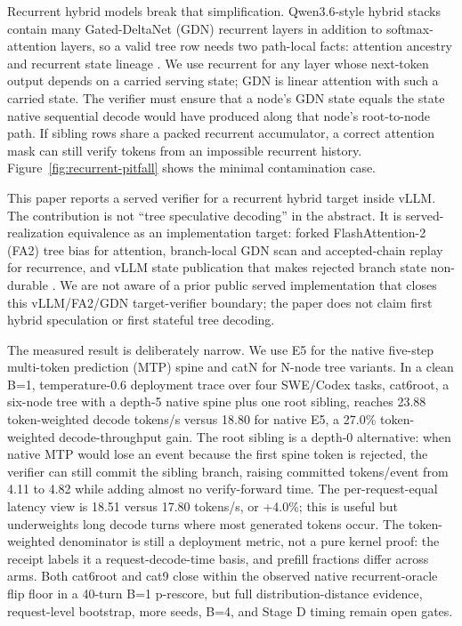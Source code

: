 \documentclass[conference]{IEEEtran}
\begin{document}
Recurrent hybrid models break that simplification. Qwen3.6-style hybrid stacks contain many Gated-DeltaNet (GDN) recurrent layers in addition to softmax-attention layers, so a valid tree row needs two path-local facts: attention ancestry and recurrent state lineage \cite{yang2024gated,qwen2026qwen36fp8}. We use recurrent for any layer whose next-token output depends on a carried serving state; GDN is linear attention with such a carried state. The verifier must ensure that a node's GDN state equals the state native sequential decode would have produced along that node's root-to-node path. If sibling rows share a packed recurrent accumulator, a correct attention mask can still verify tokens from an impossible recurrent history. Figure~\ref{fig:recurrent-pitfall} shows the minimal contamination case.

This paper reports a served verifier for a recurrent hybrid target inside vLLM. The contribution is not ``tree speculative decoding'' in the abstract. It is served-realization equivalence as an implementation target: forked FlashAttention-2 (FA2) tree bias for attention, branch-local GDN scan and accepted-chain replay for recurrence, and vLLM state publication that makes rejected branch state non-durable \cite{dao2023flashattention,kwon2023efficient,lumo2026receipts}. We are not aware of a prior public served implementation that closes this vLLM/FA2/GDN target-verifier boundary; the paper does not claim first hybrid speculation or first stateful tree decoding.

The measured result is deliberately narrow. We use E5 for the native five-step multi-token prediction (MTP) spine and catN for N-node tree variants. In a clean B=1, temperature-0.6 deployment trace over four SWE/Codex tasks, cat6root, a six-node tree with a depth-5 native spine plus one root sibling, reaches 23.88 token-weighted decode tokens/s versus 18.80 for native E5, a 27.0\% token-weighted decode-throughput gain. The root sibling is a depth-0 alternative: when native MTP would lose an event because the first spine token is rejected, the verifier can still commit the sibling branch, raising committed tokens/event from 4.11 to 4.82 while adding almost no verify-forward time. The per-request-equal latency view is 18.51 versus 17.80 tokens/s, or +4.0\%; this is useful but underweights long decode turns where most generated tokens occur. The token-weighted denominator is still a deployment metric, not a pure kernel proof: the receipt labels it a request-decode-time basis, and prefill fractions differ across arms. Both cat6root and cat9 close within the observed native recurrent-oracle flip floor in a 40-turn B=1 p-rescore, but full distribution-distance evidence, request-level bootstrap, more seeds, B=4, and Stage D timing remain open gates.
\end{document}
